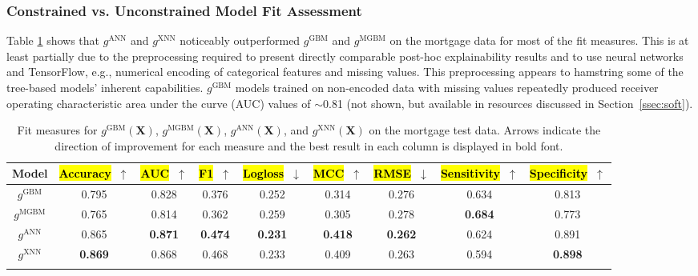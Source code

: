 \documentclass[information,article,accept,moreauthors,pdftex]{Definitions/mdpi}
\begin{document}
{{{\subsubsection{Constrained vs. Unconstrained Model Fit Assessment}\label{ssec:c_v_uc_mort}

Table \ref{tab:mort_acc} shows that $g^\text{ANN}$ and $g^\text{XNN}$ noticeably outperformed $g^\text{GBM}$ and $g^\text{MGBM}$ on the mortgage data for most of the fit measures. This is at least partially due to the preprocessing required to present directly comparable post-hoc explainability results and to use neural networks and TensorFlow, e.g., numerical encoding of categorical features and missing values. This preprocessing appears to hamstring some of the tree-based models' inherent capabilities. $g^\text{GBM}$ models trained on non-encoded data with missing values repeatedly produced receiver operating characteristic area under the curve (AUC) values of $\sim$0.81 (not shown, but available in resources discussed in Section~\ref{ssec:soft}). 

\begin{table}[H]%
	\caption{Fit measures for $g^\text{GBM}(\mathbf{X})$, $g^\text{MGBM}(\mathbf{X})$, $g^\text{ANN}(\mathbf{X})$, and $g^\text{XNN}(\mathbf{X})$ on the mortgage test data. Arrows indicate the direction of improvement for each measure and the best result in each column is displayed in bold font.}
\centering
\begin{tabular}{ccccccccc}
	\toprule
	\textbf{Model} & 	
	{\textbf{\hl{Accuracy}}}~$\uparrow$ & 
	{\textbf{\hl{AUC}}}~$\uparrow$ & 
	{\textbf{\hl{F1}}}~$\uparrow$ & 
	{\textbf{\hl{Logloss}}}~$\downarrow$ & 
	{\textbf{\hl{MCC}}}~$\uparrow$ & 
	{\textbf{\hl{RMSE}}}~$\downarrow$ & 
	{\textbf{\hl{Sensitivity}}}~$\uparrow$ & 
	{\textbf{\hl{Specificity}}}~$\uparrow$ \\
	\midrule	
$g^\text{GBM}$		& 0.795	& 0.828	& 0.376 & 0.252 & 0.314 & 0.276 & 0.634 & 0.813 \\
$g^\text{MGBM}$		& 0.765	& 0.814	& 0.362 & 0.259 & 0.305 & 0.278 & \textbf{0.684} & 0.773 \\
$g^\text{ANN}$		& 0.865	& \textbf{0.871} & \textbf{0.474} & \textbf{0.231} & \textbf{0.418} & \textbf{0.262} & 0.624 & 0.891 \\
$g^\text{XNN}$		& \textbf{0.869} & 0.868 & 0.468 & 0.233 & 0.409 & 0.263 & 0.594 & \textbf{0.898} \\
\bottomrule
\label{tab:mort_acc}
\end{tabular}
\end{table}

}}}
\end{document}
